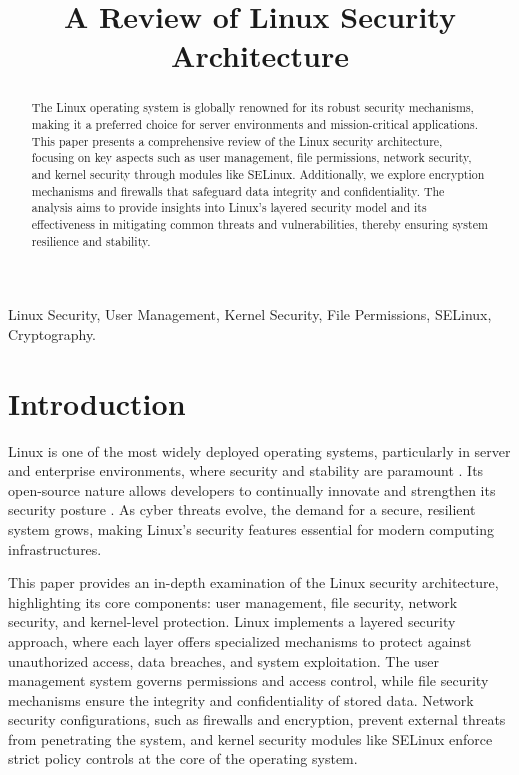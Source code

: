 \documentclass[conference]{IEEEtran}
\title{A Review of Linux Security Architecture}
\author{
    \IEEEauthorblockN{Mohammad Mahdi Ahmadi}
    \IEEEauthorblockA{
        Instructor: Zeinab Aghaei \\
        \textit{Department of Electrical and Computer Engineering} \\
        \textit{Isfahan University of Technology}\\
        mohammadmahdi\_ahmadi@ec.iut.ac.ir
    }
}
\begin{document}
\maketitle

\begin{abstract}
The Linux operating system is globally renowned for its robust security mechanisms, making it a preferred choice for server environments and mission-critical applications. This paper presents a comprehensive review of the Linux security architecture, focusing on key aspects such as user management, file permissions, network security, and kernel security through modules like SELinux. Additionally, we explore encryption mechanisms and firewalls that safeguard data integrity and confidentiality. The analysis aims to provide insights into Linux's layered security model and its effectiveness in mitigating common threats and vulnerabilities, thereby ensuring system resilience and stability.
\end{abstract}

\begin{IEEEkeywords}
Linux Security, User Management, Kernel Security, File Permissions, SELinux, Cryptography.
\end{IEEEkeywords}

\section{Introduction}
Linux is one of the most widely deployed operating systems, particularly in server and enterprise environments, where security and stability are paramount \cite{liquid-web}. Its open-source nature allows developers to continually innovate and strengthen its security posture \cite{linux-training}. As cyber threats evolve, the demand for a secure, resilient system grows, making Linux’s security features essential for modern computing infrastructures.

This paper provides an in-depth examination of the Linux security architecture, highlighting its core components: user management, file security, network security, and kernel-level protection. Linux implements a layered security approach, where each layer offers specialized mechanisms to protect against unauthorized access, data breaches, and system exploitation. The user management system governs permissions and access control, while file security mechanisms ensure the integrity and confidentiality of stored data. Network security configurations, such as firewalls and encryption, prevent external threats from penetrating the system, and kernel security modules like SELinux enforce strict policy controls at the core of the operating system.
\end{document}
